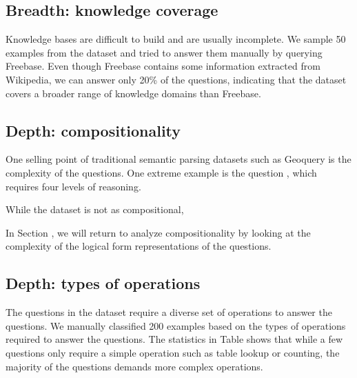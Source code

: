 \subsection{Breadth: knowledge coverage}

Knowledge bases are difficult to build
and are usually incomplete.
We sample 50 examples from the \wtq dataset
and tried to answer them manually by
querying Freebase.
Even though Freebase contains some information
extracted from Wikipedia,
we can answer only 20\% of the questions,
indicating that the dataset covers
a broader range of knowledge domains than Freebase.

\subsection{Depth: compositionality}

One selling point of traditional semantic parsing datasets
such as Geoquery \cite{Zelle1996LearningTP}
is the complexity of the questions.
One extreme example is the question
,
which requires four levels of reasoning.

While the \wtq dataset is not as compositional,

In Section , we will return to analyze
compositionality
by looking at the complexity of the logical form
representations of the questions.

\subsection{Depth: types of operations}

The questions in the \wtq dataset require
a diverse set of operations to answer the questions.
We manually classified 200 examples based on the
types of operations required to answer the questions.
The statistics in Table  shows that
while a few questions only require a simple operation
such as table lookup or counting, the majority of the questions
demands more complex operations.